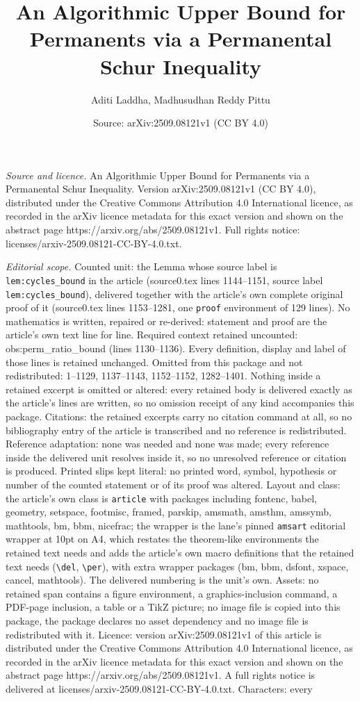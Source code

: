 \documentclass[10pt,a4paper]{amsart}
\title[An Algorithmic Upper Bound for Permanents via a Permanental ]{An Algorithmic Upper Bound for Permanents via a Permanental Schur Inequality}
\author{Aditi Laddha, Madhusudhan Reddy Pittu}
\date{Source: arXiv:2509.08121v1 (CC BY 4.0)}
\begin{document}
\maketitle

\noindent\emph{Source and licence.} An Algorithmic Upper Bound for Permanents via a Permanental Schur Inequality. Version arXiv:2509.08121v1 (CC BY 4.0), distributed under the Creative Commons Attribution 4.0 International licence, as recorded in the arXiv licence metadata for this exact version and shown on the abstract page https://arxiv.org/abs/2509.08121v1. Full rights notice: licenses/arxiv-2509.08121-CC-BY-4.0.txt.\par\smallskip

\noindent\textit{Editorial scope.} Counted unit: the Lemma whose source label is \texttt{lem:cycles\_bound} in the article (source0.tex lines 1144--1151, source label \texttt{lem:cycles\_bound}), delivered together with the article's own complete original proof of it (source0.tex lines 1153--1281, one \texttt{proof} environment of 129 lines). No mathematics is written, repaired or re-derived: statement and proof are the article's own text line for line. Required context retained uncounted: obs:perm\_ratio\_bound (lines 1130--1136). Every definition, display and label of those lines is retained unchanged. Omitted from this package and not redistributed: 1--1129, 1137--1143, 1152--1152, 1282--1401. Nothing inside a retained excerpt is omitted or altered: every retained body is delivered exactly as the article's lines are written, so no omission receipt of any kind accompanies this package. Citations: the retained excerpts carry no citation command at all, so no bibliography entry of the article is transcribed and no reference is redistributed. Reference adaptation: none was needed and none was made; every reference inside the delivered unit resolves inside it, so no unresolved reference or citation is produced. Printed slips kept literal: no printed word, symbol, hypothesis or number of the counted statement or of its proof was altered. Layout and class: the article's own class is \texttt{article} with packages including fontenc, babel, geometry, setspace, footmisc, framed, parskip, amsmath, amsthm, amssymb, mathtools, bm, bbm, nicefrac; the wrapper is the lane's pinned \texttt{amsart} editorial wrapper at 10pt on A4, which restates the theorem-like environments the retained text needs and adds the article's own macro definitions that the retained text needs (\texttt{\textbackslash del}, \texttt{\textbackslash per}), with extra wrapper packages (bm, bbm, dsfont, xspace, cancel, mathtools). The delivered numbering is the unit's own. Assets: no retained span contains a figure environment, a graphics-inclusion command, a PDF-page inclusion, a table or a TikZ picture; no image file is copied into this package, the package declares no asset dependency and no image file is redistributed with it. Licence: version arXiv:2509.08121v1 of this article is distributed under the Creative Commons Attribution 4.0 International licence, as recorded in the arXiv licence metadata for this exact version and shown on the abstract page https://arxiv.org/abs/2509.08121v1. A full rights notice is delivered at licenses/arxiv-2509.08121-CC-BY-4.0.txt. Characters: every 
\end{document}
